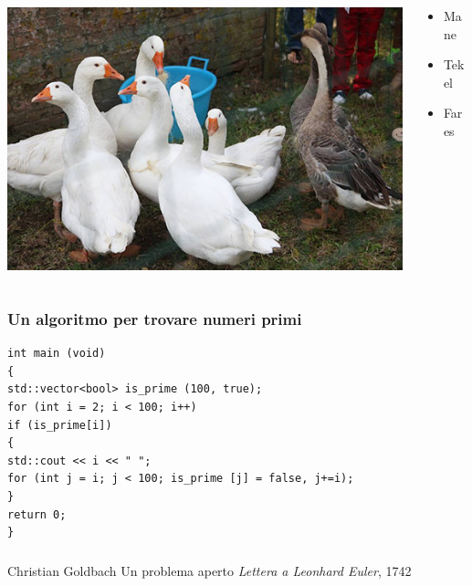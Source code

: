 \documentclass[handout,xcolor=dvipsnames,aspectratio=169]{beamer}
\begin{document}
{\begin{frame}
\begin{columns}
\begin{column}{0.4\textwidth}
\includegraphics[width=\columnwidth]{Immagini/duck.jpg}
\end{column}

\begin{column}{0.4\textwidth}
\begin{itemize}
\item Mane
\item Tekel
\item Fares
\end{itemize}
\end{column}

\end{columns}
\end{frame}


\begin{frame}[fragile]
\frametitle{Un algoritmo per trovare numeri primi}
\begin{verbatim}
int main (void)
{
std::vector<bool> is_prime (100, true);
for (int i = 2; i < 100; i++)
if (is_prime[i])
{
std::cout << i << " ";
for (int j = i; j < 100; is_prime [j] = false, j+=i);
}
return 0;
}
\end{verbatim}
\end{frame}


\begin{frame}
\frametitle{\refname}
\begin{thebibliography}{9}
 Christian Goldbach
\newblock Un problema aperto
\newblock \emph{Lettera a Leonhard Euler}, 1742
\end{thebibliography}
\end{frame}

} %
\end{document}
